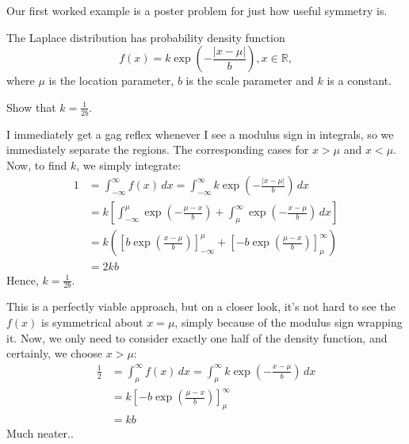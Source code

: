 \documentclass[../jarvis.tex]{subfiles}
\begin{document}
Our first worked example is a poster problem for just how useful symmetry is.
\begin{example}[Classic]
The Laplace distribution has probability density function
$$f(x)=k\exp{\left(-\frac{|x-\mu|}{b}\right)}, x \in \mathbb{R},$$
where $\mu$ is the location parameter, $b$ is the scale parameter and $k$ is a constant.

Show that $k=\frac{1}{2b}.$
\end{example}
I immediately get a gag reflex whenever I see a modulus sign in integrals, so we immediately separate the regions. The corresponding cases for $x > \mu$ and $x < \mu$. Now, to find $k$, we simply integrate:
\begin{align*}
    1&=\int_{-\infty}^{\infty}f(x) \,dx = \int_{-\infty}^{\infty}k\exp{\left(-\frac{|x-\mu|}{b}\right)} \,dx \\
    &= k\left[\int_{-\infty}^{\mu} \exp{\left(-\frac{\mu-x}{b}\right)}+\int_{\mu}^{\infty}\exp{\left(-\frac{x-\mu}{b}\right)}\,dx \right] \\
    &=k\left(\left[b\exp{\left(\frac{x-\mu}{b}\right)}\right]_{-\infty}^{\mu}+\left[-b\exp{\left(\frac{\mu-x}{b}\right)}\right]_{\mu}^{\infty}\right) \\
    &= 2kb
\end{align*}
Hence, $k=\frac{1}{2b}$.

This is a perfectly viable approach, but on a closer look, it's not hard to see the $f(x)$ is symmetrical about $x=\mu$, simply because of the modulus sign wrapping it. Now, we only need to consider exactly one half of the density function, and certainly, we choose $x > \mu$:
\begin{align*}
    \frac{1}{2}&=\int_{\mu}^{\infty}f(x) \,dx = \int_{\mu}^{\infty}k\exp{\left(-\frac{x-\mu}{b}\right)} \,dx \\
    &=k\left[-b\exp{\left(\frac{\mu-x}{b}\right)}\right]_{\mu}^{\infty} \\
    &=kb
\end{align*}
Much neater..
\end{document}
